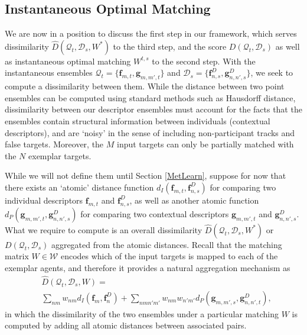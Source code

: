 \subsection{Instantaneous Optimal Matching}
\label{agg}

We are now in a position to discuss the first step in our framework, which serves dissimilarity $\hat{D}(\mathcal{Q}_{t}, \mathcal{D}_{s}, W^{*})$ to the third step, and the score $D(\mathcal{Q}_{t}, \mathcal{D}_{s})$ as well as instantaneous optimal matching $W^{t,s}$ to the second step. With the instantaneous ensembles $\mathcal{Q}_{t}=\{\mathbf{f}_{m,t},\mathbf{g}_{m,m',t}\}$ and $\mathcal{D}_{s}=\{\mathbf{f}^{D}_{n,s},\mathbf{g}^{D}_{n,n',s}\}$, we seek to compute a dissimilarity between them. While the distance between two point ensembles can be computed using standard methods such as Hausdorff distance, dissimilarity between our descriptor ensembles must account for the facts that the ensembles contain structural information between individuals (contextual descriptors), and are `noisy' in the sense of including non-participant tracks and false targets. Moreover, the $M$ input targets can only be partially matched with the $N$ exemplar targets. 

While we will not define them until Section \ref{MetLearn}, suppose for now that there exists an `atomic' distance function $d_{I}(\mathbf{f}_{m,t}, \mathbf{f}^{D}_{n,s}) $ for comparing two individual descriptors $\mathbf{f}_{m,t}$ and $\mathbf{f}^{D}_{n,s}$, as well as another atomic function $d_{P}(\mathbf{g}_{m,m',t}, \mathbf{g}^{D}_{n,n',s}) $ for comparing two contextual descriptors $\mathbf{g}_{m,m',t}$ and $\mathbf{g}^{D}_{n,n',s}$. What we require to compute is an overall dissimilarity $\hat{D}(\mathcal{Q}_{t}, \mathcal{D}_{s}, W^{*})$ or $D(\mathcal{Q}_{t}, \mathcal{D}_{s})$ aggregated from the atomic distances. Recall that the  matching matrix $W\in\mathcal{W}$ encodes which of the input targets is mapped to each of the exemplar agents, and therefore it provides a natural aggregation mechanism as 
\begin{equation}
\begin{split}
&\hat{D}(\mathcal{Q}_{t}, \mathcal{D}_{s}, W)=\\
&\sum_{nm}w_{nm}d_{I}(\mathbf{f}_{m}, \mathbf{f}^{D}_{n})+\sum_{nmn'm'}w_{nm}w_{n'm'}d_{P}(\mathbf{g}_{m,m',s}, \mathbf{g}^{D}_{n,n',t}),
\end{split}
\end{equation}
in which the dissimilarity of the two ensembles under a particular matching $W$ is computed by adding all atomic distances between associated pairs.


